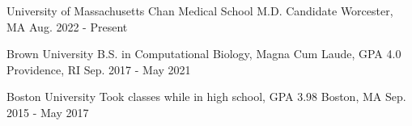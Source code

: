 
\vspace{-2mm}
\begin{cventries}

  \cventry
  {University of Massachusetts Chan Medical School} %
  {M.D. Candidate} %
  {Worcester, MA} %
  {Aug. 2022 - Present} %
  {}

  \cventry
  {Brown University} %
  {B.S. in Computational Biology, Magna Cum Laude, GPA 4.0} %
  {Providence, RI} %
  {Sep. 2017 - May 2021} %
  {}

  \cventry
  {Boston University} %
  {Took classes while in high school, GPA 3.98} %
  {Boston, MA} %
  {Sep. 2015 - May 2017} %
  {}

\end{cventries}
